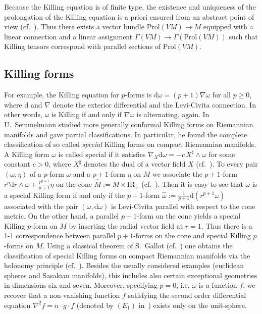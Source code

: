 \documentclass[11pt,a4paper]{article}
\theoremstyle{plain}
\theoremstyle{remark}
\newcommand{\R}{\mathrm{I\!R}}
\renewcommand{\d}{\mathrm{d}}
\begin{document}
Because the Killing equation is of finite type, the existence and uniqueness of the prolongation of the Killing equation is a priori ensured from an abstract point of view (cf.~\cite{BCEG}). Thus there exists a vector bundle $\mathrm{Prol}(VM) \to M$ equipped with a linear connection and a linear assignment $\Gamma(VM)\to \Gamma(\mathrm{Prol}(VM))$ such that Killing tensors correspond with parallel sections of $\mathrm{Prol}(VM)$.


\subsection{Killing forms}
For example, the Killing equation for $p$-forms is $\d\omega = (p+1) \nabla\omega$ for all $p\geq 0$, where $\d$ and $\nabla$ denote the exterior differential and the Levi-Civita connection.
In other words, $\omega$ is Killing if and only if $\nabla\omega$ is alternating, again. %
In~\cite{Se} U.~Semmelmann studied more generally conformal Killing forms on Riemannian manifolds and gave partial classifications. 
In particular, he found the complete classification of so called {\em special} Killing forms on compact Riemannian manifolds.
A Killing form $\omega$ is called special if it satisfies $\nabla_X \d \omega = - c\, X^\sharp\wedge \omega$ 
for some constant $c > 0$, where $X^\sharp$ denotes the dual of a vector field $X$ (cf.~\cite[Chapter~3]{Se}). 
To every pair $(\omega,\eta)$ of a $p$-form $\omega$ and a $p+1$-form $\eta$ on $M$ we associate the $p+1$-form $r^p \d r \wedge \omega + \frac{r^{p+1}}{p+1}  \eta$  
on the cone $\hat M := M\times \R_+$  (cf.~\cite[3.2.4]{Se}).
Then it is easy to see that $\omega$ is a special Killing form if and only if  the $p+1$-form $\hat\omega := \frac{1}{p+1} \d ( r^{p+1} \omega)$ associated with the pair $(\omega,\d \omega)$ is Levi-Civita parallel with respect to the cone metric. 
On the other hand, a parallel $p+1$-form on the cone yields a special Killing $p$-form on $M$ by inserting the
radial vector field at $r=1$. Thus there is a 1-1 correspondence between parallel $p+1$-forms on the cone and special Killing $p$-forms on $M$. Using a classical
theorem of S.~Gallot (cf.~\cite[Proposition~3.1]{Ga}) one obtains the classification of special Killing forms on compact Riemannian
manifolds via the holonomy principle (cf.~\cite[Theorem~3.2.6]{Se}). Besides the usually considered examples (euclidean spheres and Sasakian manifolds), this
includes also certain exceptional geometries in dimensions six and seven. Moreover, specifying $p = 0$, i.e. $\omega$ is a function $f$, we recover that a non-vanishing function $f$  satisfying the second order differential equation $\nabla^2 f = n\cdot g\cdot f$ (denoted by $(E_1)$ in~\cite{Ga}) exists only on the unit-sphere.
\end{document}
